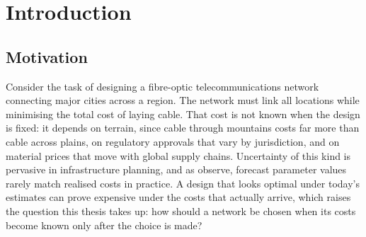 %

\chapter{Introduction}\label{ch:intro}

\section{Motivation}\label{sec:intro-motivation}

Consider the task of designing a fibre-optic telecommunications network connecting major cities across a region.
The network must link all locations while minimising the total cost of laying cable.
That cost is not known when the design is fixed: it depends on terrain, since cable through mountains costs far more than cable across plains, on regulatory approvals that vary by jurisdiction, and on material prices that move with global supply chains.
Uncertainty of this kind is pervasive in infrastructure planning, and as \textcite{KouvelisYu1997} observe, forecast parameter values rarely match realised costs in practice.
A design that looks optimal under today's estimates can prove expensive under the costs that actually arrive, which raises the question this thesis takes up: how should a network be chosen when its costs become known only after the choice is made?

